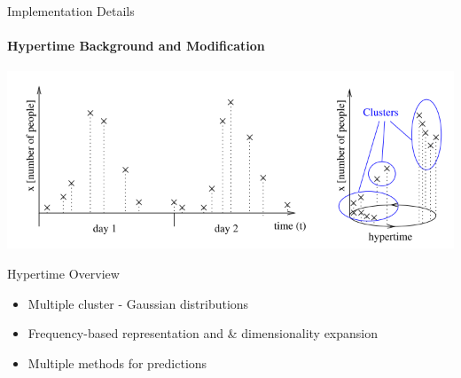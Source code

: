 \documentclass{beamer}
\begin{document}
%
%



\begin{frame}[t]{Implementation Details}
  \framesubtitle{Hypertime Background and Modification}
    \includegraphics[width=0.80\columnwidth]{images/hypertime_clustering.png}

    \begin{block}{Hypertime Overview}
      \begin{itemize}
        \item Multiple cluster - Gaussian distributions
        \item Frequency-based representation and \& dimensionality expansion
        \item Multiple methods for predictions
      \end{itemize}
    \end{block}
\end{frame}
\end{document}
